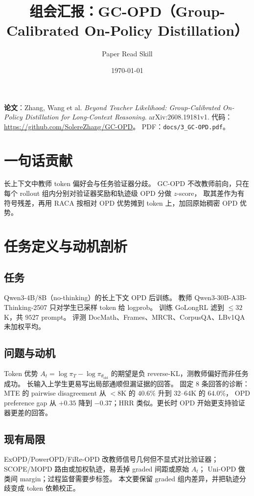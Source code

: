 \documentclass[11pt,a4paper]{ctexart}
\title{组会汇报：GC-OPD（Group-Calibrated On-Policy Distillation）}
\author{Paper Read Skill}
\date{\today}
\begin{document}
\maketitle
\tableofcontents
\newpage

\noindent\textbf{论文}：Zhang, Wang et al.
\textit{Beyond Teacher Likelihood: Group-Calibrated On-Policy Distillation for Long-Context Reasoning}.
arXiv:2608.19181v1.
代码：\url{https://github.com/SolereZhang/GC-OPD}。
PDF：\texttt{docs/3\_GC-OPD.pdf}。

\section{一句话贡献}
长上下文中教师 token 偏好会与任务验证器分歧。
GC-OPD 不改教师前向，只在每个 rollout 组内分别对验证器奖励和轨迹级 OPD 分做 $z$-score，
取其差作为有符号残差，再用 RACA 按相对 OPD 优势摊到 token 上，加回原始稠密 OPD 优势。

\section{任务定义与动机剖析}

\subsection{任务}
Qwen3-4B/8B（no-thinking）的长上下文 OPD 后训练。
教师 Qwen3-30B-A3B-Thinking-2507 只对学生已采样 token 给 logprob。
训练 GoLongRL 滤到 $\le 32$K，共 $9527$ prompt。
评测 DocMath、Frames、MRCR、CorpusQA、LBv1QA 未加权平均。

\subsection{问题与动机}
Token 优势 $A_t=\log\pi_T-\log\pi_{\theta_{\mathrm{old}}}$ 的期望是负 reverse-KL，测教师偏好而非任务成功。
长输入上学生更易写出局部通顺但漏证据的回答。
固定 8 条回答的诊断：MTE 的 pairwise disagreement 从 $<$8K 的 $40.6\%$ 升到 32--64K 的 $64.0\%$，
OPD preference gap 从 $+0.35$ 降到 $-0.37$；HRR 类似。更长时 OPD 开始更支持验证器更差的回答。

\subsection{现有局限}
ExOPD/PowerOPD/FiRe-OPD 改教师信号几何但不显式对比验证器；
SCOPE/MOPD 路由或加权轨迹，易丢掉 graded 间距或原始 $A_t$；
Uni-OPD 做类间 margin；过程监督需要步标签。
本文要保留 graded 组内差异，并把轨迹分歧变成 token 依赖校正。
\end{document}
